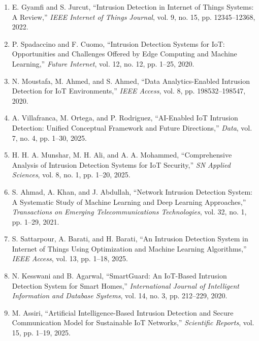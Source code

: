 \documentclass[12pt,a4paper,oneside]{report}
\begin{document}
\begin{enumerate}

\item \label{ref1} E. Gyamfi and S. Jurcut, ``Intrusion Detection in Internet of Things Systems: A Review,'' \textit{IEEE Internet of Things Journal}, vol. 9, no. 15, pp. 12345--12368, 2022.

\item \label{ref2} P. Spadaccino and F. Cuomo, ``Intrusion Detection Systems for IoT: Opportunities and Challenges Offered by Edge Computing and Machine Learning,'' \textit{Future Internet}, vol. 12, no. 12, pp. 1--25, 2020.

\item \label{ref3} N. Moustafa, M. Ahmed, and S. Ahmed, ``Data Analytics-Enabled Intrusion Detection for IoT Environments,'' \textit{IEEE Access}, vol. 8, pp. 198532--198547, 2020.

\item \label{ref4} A. Villafranca, M. Ortega, and P. Rodriguez, ``AI-Enabled IoT Intrusion Detection: Unified Conceptual Framework and Future Directions,'' \textit{Data}, vol. 7, no. 4, pp. 1--30, 2025.

\item \label{ref5} H. H. A. Munshar, M. H. Ali, and A. A. Mohammed, ``Comprehensive Analysis of Intrusion Detection Systems for IoT Security,'' \textit{SN Applied Sciences}, vol. 8, no. 1, pp. 1--20, 2025.

\item \label{ref6} S. Ahmad, A. Khan, and J. Abdullah, ``Network Intrusion Detection System: A Systematic Study of Machine Learning and Deep Learning Approaches,'' \textit{Transactions on Emerging Telecommunications Technologies}, vol. 32, no. 1, pp. 1--29, 2021.

\item \label{ref7} S. Sattarpour, A. Barati, and H. Barati, ``An Intrusion Detection System in Internet of Things Using Optimization and Machine Learning Algorithms,'' \textit{IEEE Access}, vol. 13, pp. 1--18, 2025.

\item \label{ref8} N. Kesswani and B. Agarwal, ``SmartGuard: An IoT-Based Intrusion Detection System for Smart Homes,'' \textit{International Journal of Intelligent Information and Database Systems}, vol. 14, no. 3, pp. 212--229, 2020.

\item \label{ref9} M. Assiri, ``Artificial Intelligence-Based Intrusion Detection and Secure Communication Model for Sustainable IoT Networks,'' \textit{Scientific Reports}, vol. 15, pp. 1--19, 2025.


\end{enumerate}
\end{document}
